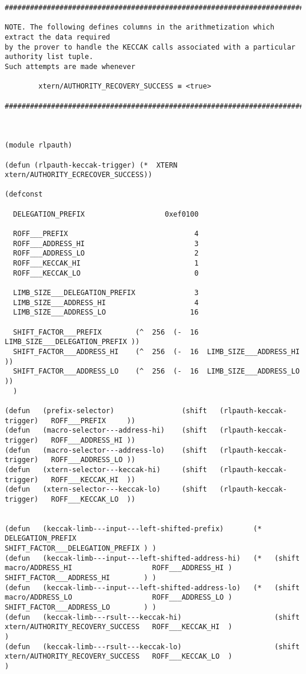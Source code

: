 \documentclass[varwidth=\maxdimen,margin=0.5cm,multi={verbatim}]{standalone}
\begin{document}
\begin{verbatim}
##########################################################################################

NOTE. The following defines columns in the arithmetization which extract the data required
by the prover to handle the KECCAK calls associated with a particular authority list tuple.
Such attempts are made whenever

        xtern/AUTHORITY_RECOVERY_SUCCESS ≡ <true>

##########################################################################################



(module rlpauth)

(defun (rlpauth-keccak-trigger) (*  XTERN  xtern/AUTHORITY_ECRECOVER_SUCCESS))

(defconst

  DELEGATION_PREFIX                   0xef0100

  ROFF___PREFIX                              4
  ROFF___ADDRESS_HI                          3
  ROFF___ADDRESS_LO                          2
  ROFF___KECCAK_HI                           1
  ROFF___KECCAK_LO                           0

  LIMB_SIZE___DELEGATION_PREFIX              3
  LIMB_SIZE___ADDRESS_HI                     4
  LIMB_SIZE___ADDRESS_LO                    16

  SHIFT_FACTOR___PREFIX        (^  256  (-  16  LIMB_SIZE___DELEGATION_PREFIX ))
  SHIFT_FACTOR___ADDRESS_HI    (^  256  (-  16  LIMB_SIZE___ADDRESS_HI        ))
  SHIFT_FACTOR___ADDRESS_LO    (^  256  (-  16  LIMB_SIZE___ADDRESS_LO        ))
  )

(defun   (prefix-selector)                (shift   (rlpauth-keccak-trigger)   ROFF___PREFIX     ))
(defun   (macro-selector---address-hi)    (shift   (rlpauth-keccak-trigger)   ROFF___ADDRESS_HI ))
(defun   (macro-selector---address-lo)    (shift   (rlpauth-keccak-trigger)   ROFF___ADDRESS_LO ))
(defun   (xtern-selector---keccak-hi)     (shift   (rlpauth-keccak-trigger)   ROFF___KECCAK_HI  ))
(defun   (xtern-selector---keccak-lo)     (shift   (rlpauth-keccak-trigger)   ROFF___KECCAK_LO  ))


(defun   (keccak-limb---input---left-shifted-prefix)       (*            DELEGATION_PREFIX                                        SHIFT_FACTOR___DELEGATION_PREFIX ) )
(defun   (keccak-limb---input---left-shifted-address-hi)   (*   (shift   macro/ADDRESS_HI                   ROFF___ADDRESS_HI )   SHIFT_FACTOR___ADDRESS_HI        ) )
(defun   (keccak-limb---input---left-shifted-address-lo)   (*   (shift   macro/ADDRESS_LO                   ROFF___ADDRESS_LO )   SHIFT_FACTOR___ADDRESS_LO        ) )
(defun   (keccak-limb---rsult---keccak-hi)                      (shift   xtern/AUTHORITY_RECOVERY_SUCCESS   ROFF___KECCAK_HI  )                                      )
(defun   (keccak-limb---rsult---keccak-lo)                      (shift   xtern/AUTHORITY_RECOVERY_SUCCESS   ROFF___KECCAK_LO  )                                      )



\end{verbatim}
\end{document}
